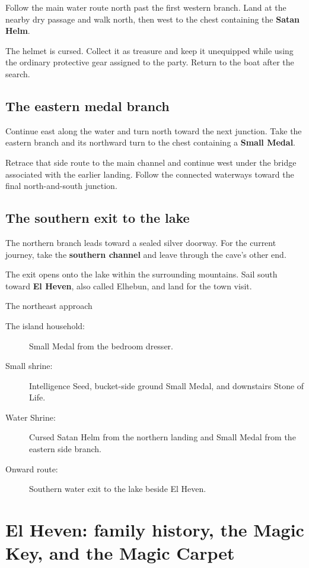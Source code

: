 Follow the main water route north past the first western branch.
Land at the nearby dry passage and walk north, then west to the
chest containing the \textbf{Satan Helm}.

The helmet is cursed. Collect it as treasure and keep it unequipped
while using the ordinary protective gear assigned to the party.
Return to the boat after the search.

\subsection*{The eastern medal branch}

Continue east along the water and turn north toward the next junction.
Take the eastern branch and its northward turn to the chest
containing a \textbf{Small Medal}.

Retrace that side route to the main channel and continue west under
the bridge associated with the earlier landing. Follow the connected
waterways toward the final north-and-south junction.

\subsection*{The southern exit to the lake}

The northern branch leads toward a sealed silver doorway. For
the current journey, take the \textbf{southern channel} and
leave through the cave's other end.

The exit opens onto the lake within the surrounding mountains.
Sail south toward \textbf{El Heven}, also called Elhebun, and
land for the town visit.

\begin{routecheck}{The northeast approach}
\begin{description}
  \item[The island household:] Small Medal from the bedroom dresser.
  \item[Small shrine:] Intelligence Seed, bucket-side ground Small
    Medal, and downstairs Stone of Life.
  \item[Water Shrine:] Cursed Satan Helm from the northern landing
    and Small Medal from the eastern side branch.
  \item[Onward route:] Southern water exit to the lake beside El Heven.
\end{description}
\end{routecheck}

\section{El Heven: family history, the Magic Key, and the Magic Carpet}

